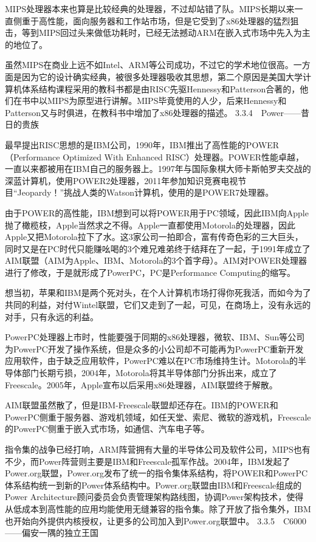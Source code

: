 \documentclass[12pt,UTF8]{ctexbook}
\begin{document}
MIPS处理器本来也算是比较经典的处理器，不过却站错了队。MIPS长期以来一直侧重于高性能，面向服务器和工作站市场，但是它受到了x86处理器的猛烈狙击，等到MIPS回过头来做低功耗时，已经无法撼动ARM在嵌入式市场中先入为主的地位了。

虽然MIPS在商业上远不如Intel、ARM等公司成功，不过它的学术地位很高。一方面是因为它的设计确实经典，被很多处理器吸收其思想，第二个原因是美国大学计算机体系结构课程采用的教科书都是由RISC先驱Hennessy和Patterson合著的，他们在书中以MIPS为原型进行讲解。MIPS毕竟使用的人少，后来Hennessy和Patterson又与时俱进，在教科书中增加了x86处理器的描述。
3.3.4　Power——昔日的贵族

最早提出RISC思想的是IBM公司，1990年，IBM推出了高性能的POWER（Performance Optimized With Enhanced RISC）处理器。POWER性能卓越，一直以来都被用在IBM自己的服务器上。1997年与国际象棋大师卡斯帕罗夫交战的深蓝计算机，使用POWER2处理器，2011年参加知识竞赛电视节目“Jeopardy！”挑战人类的Watson计算机，使用的是POWER7处理器。

由于POWER的高性能，IBM想到可以将POWER用于PC领域，因此IBM向Apple抛了橄榄枝，Apple当然求之不得。Apple一直都使用Motorola的处理器，因此Apple又把Motorola拉下了水。这3家公司一拍即合，富有传奇色彩的三大巨头，同时又是在PC时代只能赚吆喝的3个难兄难弟终于结拜在了一起，于1991年成立了AIM联盟（AIM为Apple、IBM、Motorola的3个首字母）。AIM对POWER处理器进行了修改，于是就形成了PowerPC，PC是Performance Computing的缩写。

想当初，苹果和IBM是两个死对头，在个人计算机市场打得你死我活，而如今为了共同的利益，对付Wintel联盟，它们又走到了一起，可见，在商场上，没有永远的对手，只有永远的利益。

PowerPC处理器上市时，性能要强于同期的x86处理器，微软、IBM、Sun等公司为PowerPC开发了操作系统，但是众多的小公司却不可能再为PowerPC重新开发应用软件，由于缺乏应用软件，PowerPC难以在PC市场维持生计。Motorola的半导体部门长期亏损，2004年，Motorola将其半导体部门分拆出来，成立了Freescale。2005年，Apple宣布以后采用x86处理器，AIM联盟终于解散。

AIM联盟虽然散了，但是IBM-Freescale联盟却还存在。IBM的POWER和PowerPC侧重于服务器、游戏机领域，如任天堂、索尼、微软的游戏机，Freescale的PowerPC侧重于嵌入式市场，如通信、汽车电子等。

指令集的战争已经打响，ARM阵营拥有大量的半导体公司及软件公司，MIPS也有不少，而Power阵营则主要是IBM和Freescale孤军作战。2004年，IBM发起了Power.org联盟，Power.org发布了统一的指令集体系结构，将POWER和PowerPC体系结构统一到新的Power体系结构中。Power.org联盟由IBM和Freescale组成的Power Architecture顾问委员会负责管理架构路线图，协调Power架构技术，使得从低成本到高性能的应用均能使用无缝兼容的指令集。除了开放了指令集外，IBM也开始向外提供内核授权，让更多的公司加入到Power.org联盟中。
3.3.5　C6000——偏安一隅的独立王国
\end{document}
